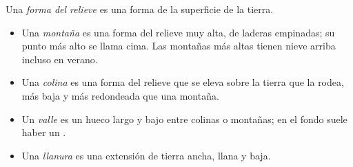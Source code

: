 \begin{definition}\label{def:g1:landscapes-around-us:landform}
Una \emph{forma del relieve} es una forma de la
superficie de la tierra.
\begin{itemize}
  \item Una \emph{montaña} es una forma del relieve muy alta,
        de laderas empinadas; su punto más alto se llama cima. Las
        montañas más altas tienen nieve arriba incluso en verano.
  \item Una \emph{colina} es una forma del relieve que se
        eleva sobre la tierra que la rodea, más baja y más redondeada que
        una montaña.
  \item Un \emph{valle} es un hueco largo y bajo entre colinas
        o montañas; en el fondo suele haber un .
  \item Una \emph{llanura} es una extensión de tierra ancha,
        llana y baja.
\end{itemize}
\end{definition}

